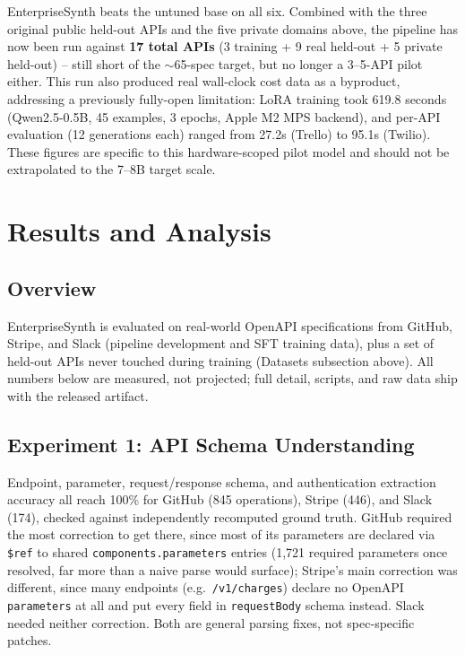 \documentclass[letterpaper]{article} %
\begin{document}
EnterpriseSynth beats the untuned base on all six. Combined with the three original public
held-out APIs and the five private domains above, the pipeline has now been run against
\textbf{17 total APIs} (3 training + 9 real held-out + 5 private held-out) -- still short of the
$\sim$65-spec target, but no longer a 3--5-API pilot either. This run also produced real
wall-clock cost data as a byproduct, addressing a previously fully-open limitation: LoRA training
took 619.8 seconds (Qwen2.5-0.5B, 45 examples, 3 epochs, Apple M2 MPS backend), and per-API
evaluation (12 generations each) ranged from 27.2s (Trello) to 95.1s (Twilio). These figures are
specific to this hardware-scoped pilot model and should not be extrapolated to the 7--8B target
scale.

\section{Results and Analysis}

\subsection{Overview}
EnterpriseSynth is evaluated on real-world OpenAPI specifications from GitHub, Stripe, and Slack
(pipeline development and SFT training data), plus a set of held-out APIs never touched during
training (Datasets subsection above). All numbers below are measured, not projected; full detail,
scripts, and raw data ship with the released artifact.

\subsection{Experiment 1: API Schema Understanding}
Endpoint, parameter, request/response schema, and authentication extraction accuracy all reach
100\% for GitHub (845 operations), Stripe (446), and Slack (174), checked against independently
recomputed ground truth. GitHub required the most correction to get there, since most of its
parameters are declared via \texttt{\$ref} to shared \texttt{components.parameters} entries
(1{,}721 required parameters once resolved, far more than a naive parse would surface); Stripe's
main correction was different, since many endpoints (e.g.\ \texttt{/v1/charges}) declare no
OpenAPI \texttt{parameters} at all and put every field in \texttt{requestBody} schema instead.
Slack needed neither correction. Both are general parsing fixes, not spec-specific patches.
\end{document}
